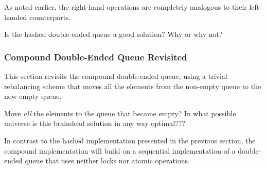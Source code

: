 As noted earlier, the right-hand operations are completely analogous
to their left-handed counterparts.

\QuickQuiz{}
	Is the hashed double-ended queue a good solution?
	Why or why not?
 \QuickQuizEnd

\subsubsection{Compound Double-Ended Queue Revisited}
\label{sec:SMPdesign:Compound Double-Ended Queue Revisited}

This section revisits the compound double-ended queue, using a trivial
rebalancing scheme that moves all the elements from the non-empty
queue to the now-empty queue.

\QuickQuiz{}
	Move \emph{all} the elements to the queue that became empty?
	In what possible universe is this braindead solution in any
	way optimal???
 \QuickQuizEnd

In contrast to the hashed implementation presented in
the previous section, the compound implementation will build on
a sequential implementation of a double-ended queue that uses
neither locks nor atomic operations.

